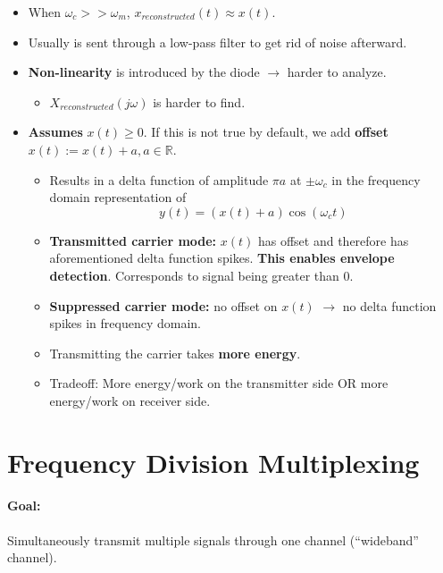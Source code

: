 \documentclass[a4paper,12pt]{report}
\begin{document}
\begin{itemize}
\item When $\omega_c >> \omega_m$, $x_{reconstructed}(t) \approx x(t)$.
\item Usually is sent through a low-pass filter to get rid of noise afterward.
\item \textbf{Non-linearity} is introduced by the diode $\to$ harder to analyze.
\begin{itemize}
\item $X_{reconstructed}(j\omega)$ is harder to find.
\end{itemize}
\item \textbf{Assumes} $x(t) \geq 0$. If this is not true by default, we add \textbf{offset} $x(t) := x(t) + a, a\in \mathbb{R}$.
\begin{itemize}
\item Results in a delta function of amplitude $\pi a$ at $\pm \omega_c$ in the frequency domain representation of 
\begin{equation}
y(t) = (x(t) + a)\cos(\omega_c t)
\end{equation}
\item \textbf{Transmitted carrier mode: } $x(t)$ has offset and therefore has aforementioned delta function spikes. \textbf{This enables envelope detection}. Corresponds to signal being greater than 0.
\item \textbf{Suppressed carrier mode: } no offset on $x(t)$ $\to$ no delta function spikes in frequency domain.
\item Transmitting the carrier takes \textbf{more energy}.
\item Tradeoff: More energy/work on the transmitter side OR more energy/work on receiver side. 
\end{itemize}
\end{itemize}

\section{Frequency Division Multiplexing}

\paragraph{Goal: } Simultaneously transmit multiple signals through one channel (``wideband'' channel).
\end{document}
